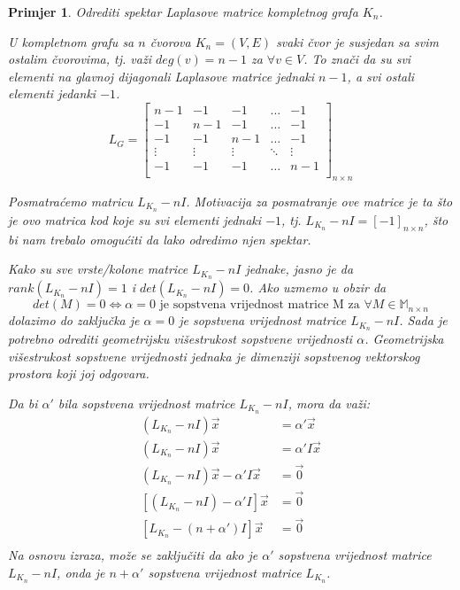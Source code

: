 \documentclass[11pt]{article}
\newtheorem{example}{Primjer}
\begin{document}
	\begin{example}{Odrediti spektar Laplasove matrice kompletnog grafa $K_n$}.

	U kompletnom grafu sa $n$ čvorova $K_n =(V,E)$ svaki čvor je susjedan sa svim ostalim čvorovima, 
	tj. važi $deg(v)=n-1$ za $\forall v \in V$. To znači da su svi elementi na glavnoj dijagonali Laplasove matrice jednaki $n-1$,
	a svi ostali elementi jedanki $-1$.
	\[
	L_G =
	\begin{bmatrix}
	n-1 & -1 & -1 & \dots & -1 \\
	-1 & n-1 & -1 & \dots & -1 \\
	-1 & -1 & n-1 & \dots & -1 \\
	\vdots & \vdots & \vdots & \ddots & \vdots \\
	-1 & -1 & -1 & \dots & n-1 \\
	\end{bmatrix}_{n \times n}
	\]
	
	Posmatraćemo matricu $L_{K_n} - nI$. Motivacija za posmatranje ove matrice je ta što je ovo matrica kod koje su svi elementi jednaki $-1$, tj. $L_{K_n} - nI = [-1]_{n \times n}$,
	što bi nam trebalo omogućiti da lako odredimo njen spektar.
	
	Kako su sve vrste/kolone matrice $L_{K_n} - nI$ jednake, jasno je da $rank(L_{K_n} - nI) = 1$ i $det(L_{K_n} - nI) = 0$. 
	Ako uzmemo u obzir da 
	\[
	det(M) = 0 \Leftrightarrow \alpha = 0 \text{ je sopstvena vrijednost matrice M za } \forall M \in \mathbb{M}_{n \times n}
	\]
	dolazimo do zaključka je $\alpha = 0$ je sopstvena vrijednost matrice $L_{K_n} - nI$. 
	Sada je potrebno odrediti geometrijsku višestrukost sopstvene vrijednosti $\alpha$. Geometrijska višestrukost sopstvene vrijednosti jednaka je dimenziji sopstvenog vektorskog prostora koji joj odgovara.
	
	Da bi $\alpha'$ bila sopstvena vrijednost matrice $L_{K_n} - nI$, mora da važi:
	\[
	\begin{split}
	(L_{K_n} - nI)\vec{x} &= \alpha' \vec{x} \\
	(L_{K_n} - nI)\vec{x} &= \alpha' I \vec{x} \\
	(L_{K_n} - nI)\vec{x} - \alpha' I \vec{x} &= \vec{0}  \\
	[(L_{K_n} - nI) - \alpha' I] \vec{x} &= \vec{0}  \\
	[L_{K_n} - (n + \alpha') I] \vec{x} &= \vec{0}  \\
	\end{split}
	\]
	Na osnovu izraza, može se zaključiti da ako je $\alpha'$ sopstvena vrijednost matrice $L_{K_n} - nI$, onda je $n + \alpha'$ sopstvena vrijednost matrice $L_{K_n}$.


\end{example}
\end{document}
